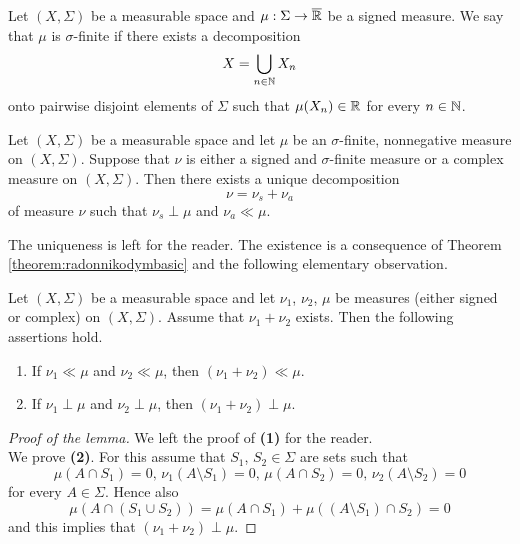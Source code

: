 \begin{definition}
Let $(X,\Sigma)$ be a measurable space and $\mu:\Sigma \rightarrow \overline{{\mathbb R}}$ be a signed measure. We say that $\mu$ is $\sigma$-finite if there exists a decomposition
$$X = \bigcup_{n\in {\mathbb N}}X_n$$
onto pairwise disjoint elements of $\Sigma$ such that $\mu(X_n)\in {\mathbb R}$ for every $n\in {\mathbb N}$.
\end{definition}

\begin{theorem}\label{theorem:lebesguedecomposition}
Let $(X,\Sigma)$ be a measurable space and let $\mu$ be an $\sigma$-finite, nonnegative measure on $(X,\Sigma)$. Suppose that $\nu$ is either a signed and $\sigma$-finite measure or a complex measure on $(X,\Sigma)$. Then there exists a unique decomposition 
$$\nu = \nu_s + \nu_a$$
of measure $\nu$ such that $\nu_s \perp \mu$ and $\nu_a \ll \mu$.
\end{theorem}
\noindent
The uniqueness is left for the reader. The existence is a consequence of Theorem \ref{theorem:radonnikodymbasic} and the following elementary observation.

\begin{lemma}\label{lemma:linearspaceforsingularandabsolutecontinuous}
Let $(X,\Sigma)$ be a measurable space and let $\nu_1$, $\nu_2$, $\mu$ be measures (either signed or complex) on $(X,\Sigma)$. Assume that $\nu_1+\nu_2$ exists. Then the following assertions hold.
\begin{enumerate}[label=\emph{\textbf{(\arabic*)}}, leftmargin=*]
\item If $\nu_1 \ll \mu$ and $\nu_2 \ll \mu$, then $(\nu_1+\nu_2) \ll \mu$.
\item If $\nu_1\perp \mu$ and $\nu_2 \perp \mu$, then $(\nu_1+\nu_2) \perp \mu$.
\end{enumerate} 
\end{lemma}
\begin{proof}[Proof of the lemma]
We left the proof of \textbf{(1)} for the reader.\\
We prove \textbf{(2)}. For this assume that $S_1$, $S_2\in \Sigma$ are sets such that
$$\mu(A\cap S_1)=0,\,\nu_1(A\setminus S_1)=0,\,\mu(A\cap S_2)=0,\,\nu_2(A\setminus S_2)=0$$
for every $A\in \Sigma$. Hence also 
$$\mu\left(A\cap (S_1\cup S_2)\right) = \mu(A\cap S_1)+\mu\left((A\setminus S_1)\cap S_2\right) = 0$$
and this implies that $(\nu_1+\nu_2)\perp \mu$.
\end{proof}

